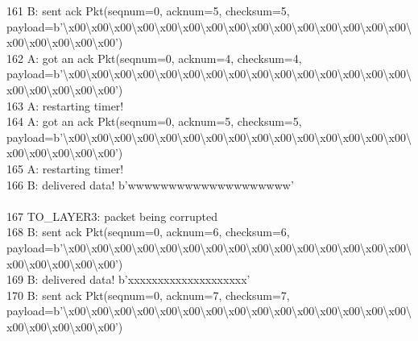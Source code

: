 \documentclass{article}
\begin{document}
{161 B: sent ack Pkt(seqnum=0, acknum=5, checksum=5,
payload=b'\textbackslash{}x00\textbackslash{}x00\textbackslash{}x00\textbackslash{}x00\textbackslash{}x00\textbackslash{}x00\textbackslash{}x00\textbackslash{}x00\textbackslash{}x00\textbackslash{}x00\textbackslash{}x00\textbackslash{}x00\textbackslash{}x00\textbackslash{}x00\textbackslash{}x00\textbackslash{}x00\textbackslash{}x00\textbackslash{}x00\textbackslash{}x00\textbackslash{}x00')
\\
162 A: got an ack Pkt(seqnum=0, acknum=4, checksum=4,
payload=b'\textbackslash{}x00\textbackslash{}x00\textbackslash{}x00\textbackslash{}x00\textbackslash{}x00\textbackslash{}x00\textbackslash{}x00\textbackslash{}x00\textbackslash{}x00\textbackslash{}x00\textbackslash{}x00\textbackslash{}x00\textbackslash{}x00\textbackslash{}x00\textbackslash{}x00\textbackslash{}x00\textbackslash{}x00\textbackslash{}x00\textbackslash{}x00\textbackslash{}x00')
\\
163 A: restarting timer! \\
164 A: got an ack Pkt(seqnum=0, acknum=5, checksum=5,
payload=b'\textbackslash{}x00\textbackslash{}x00\textbackslash{}x00\textbackslash{}x00\textbackslash{}x00\textbackslash{}x00\textbackslash{}x00\textbackslash{}x00\textbackslash{}x00\textbackslash{}x00\textbackslash{}x00\textbackslash{}x00\textbackslash{}x00\textbackslash{}x00\textbackslash{}x00\textbackslash{}x00\textbackslash{}x00\textbackslash{}x00\textbackslash{}x00\textbackslash{}x00')
\\
165 A: restarting timer! \\
166 B: delivered data! b'wwwwwwwwwwwwwwwwwwww' \\
 \\
167    \hspace*{10mm}       TO\_LAYER3: packet being corrupted \\
168 B: sent ack Pkt(seqnum=0, acknum=6, checksum=6,
payload=b'\textbackslash{}x00\textbackslash{}x00\textbackslash{}x00\textbackslash{}x00\textbackslash{}x00\textbackslash{}x00\textbackslash{}x00\textbackslash{}x00\textbackslash{}x00\textbackslash{}x00\textbackslash{}x00\textbackslash{}x00\textbackslash{}x00\textbackslash{}x00\textbackslash{}x00\textbackslash{}x00\textbackslash{}x00\textbackslash{}x00\textbackslash{}x00\textbackslash{}x00')
\\
169 B: delivered data! b'xxxxxxxxxxxxxxxxxxxx' \\
170 B: sent ack Pkt(seqnum=0, acknum=7, checksum=7,
payload=b'\textbackslash{}x00\textbackslash{}x00\textbackslash{}x00\textbackslash{}x00\textbackslash{}x00\textbackslash{}x00\textbackslash{}x00\textbackslash{}x00\textbackslash{}x00\textbackslash{}x00\textbackslash{}x00\textbackslash{}x00\textbackslash{}x00\textbackslash{}x00\textbackslash{}x00\textbackslash{}x00\textbackslash{}x00\textbackslash{}x00\textbackslash{}x00\textbackslash{}x00')
}
\end{document}
